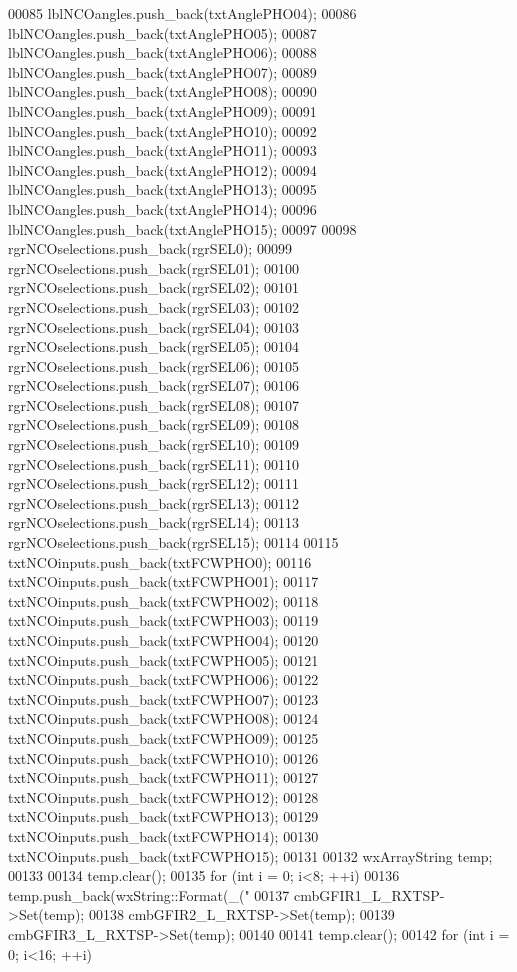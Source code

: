 \begin{DoxyCode}
00085     lblNCOangles.push\_back(txtAnglePHO04);
00086     lblNCOangles.push\_back(txtAnglePHO05);
00087     lblNCOangles.push\_back(txtAnglePHO06);
00088     lblNCOangles.push\_back(txtAnglePHO07);
00089     lblNCOangles.push\_back(txtAnglePHO08);
00090     lblNCOangles.push\_back(txtAnglePHO09);
00091     lblNCOangles.push\_back(txtAnglePHO10);
00092     lblNCOangles.push\_back(txtAnglePHO11);
00093     lblNCOangles.push\_back(txtAnglePHO12);
00094     lblNCOangles.push\_back(txtAnglePHO13);
00095     lblNCOangles.push\_back(txtAnglePHO14);
00096     lblNCOangles.push\_back(txtAnglePHO15);
00097 
00098     rgrNCOselections.push\_back(rgrSEL0);
00099     rgrNCOselections.push\_back(rgrSEL01);
00100     rgrNCOselections.push\_back(rgrSEL02);
00101     rgrNCOselections.push\_back(rgrSEL03);
00102     rgrNCOselections.push\_back(rgrSEL04);
00103     rgrNCOselections.push\_back(rgrSEL05);
00104     rgrNCOselections.push\_back(rgrSEL06);
00105     rgrNCOselections.push\_back(rgrSEL07);
00106     rgrNCOselections.push\_back(rgrSEL08);
00107     rgrNCOselections.push\_back(rgrSEL09);
00108     rgrNCOselections.push\_back(rgrSEL10);
00109     rgrNCOselections.push\_back(rgrSEL11);
00110     rgrNCOselections.push\_back(rgrSEL12);
00111     rgrNCOselections.push\_back(rgrSEL13);
00112     rgrNCOselections.push\_back(rgrSEL14);
00113     rgrNCOselections.push\_back(rgrSEL15);
00114 
00115     txtNCOinputs.push\_back(txtFCWPHO0);
00116     txtNCOinputs.push\_back(txtFCWPHO01);
00117     txtNCOinputs.push\_back(txtFCWPHO02);
00118     txtNCOinputs.push\_back(txtFCWPHO03);
00119     txtNCOinputs.push\_back(txtFCWPHO04);
00120     txtNCOinputs.push\_back(txtFCWPHO05);
00121     txtNCOinputs.push\_back(txtFCWPHO06);
00122     txtNCOinputs.push\_back(txtFCWPHO07);
00123     txtNCOinputs.push\_back(txtFCWPHO08);
00124     txtNCOinputs.push\_back(txtFCWPHO09);
00125     txtNCOinputs.push\_back(txtFCWPHO10);
00126     txtNCOinputs.push\_back(txtFCWPHO11);
00127     txtNCOinputs.push\_back(txtFCWPHO12);
00128     txtNCOinputs.push\_back(txtFCWPHO13);
00129     txtNCOinputs.push\_back(txtFCWPHO14);
00130     txtNCOinputs.push\_back(txtFCWPHO15);
00131 
00132     wxArrayString temp;
00133 
00134     temp.clear();
00135     \textcolor{keywordflow}{for} (\textcolor{keywordtype}{int} i = 0; i<8; ++i)
00136         temp.push\_back(wxString::Format(\_(\textcolor{stringliteral}{"%
00137     cmbGFIR1_L_RXTSP->Set(temp);
00138     cmbGFIR2_L_RXTSP->Set(temp);
00139     cmbGFIR3_L_RXTSP->Set(temp);
00140 
00141     temp.clear();
00142     \textcolor{keywordflow}{for} (\textcolor{keywordtype}{int} i = 0; i<16; ++i)
}
\end{DoxyCode}

